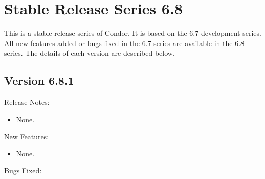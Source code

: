 \section{\label{sec:History-6-8}Stable Release Series 6.8}

This is a stable release series of Condor.
It is based on the 6.7 development series.
All new features added or bugs fixed in the 6.7 series are available
in the 6.8 series.
The details of each version are described below.


\subsection*{\label{sec:New-6-8-1}Version 6.8.1}

\noindent Release Notes:

\begin{itemize}

\item None.

\end{itemize}


\noindent New Features:

\begin{itemize}

\item None.

\end{itemize}

\noindent Bugs Fixed:

